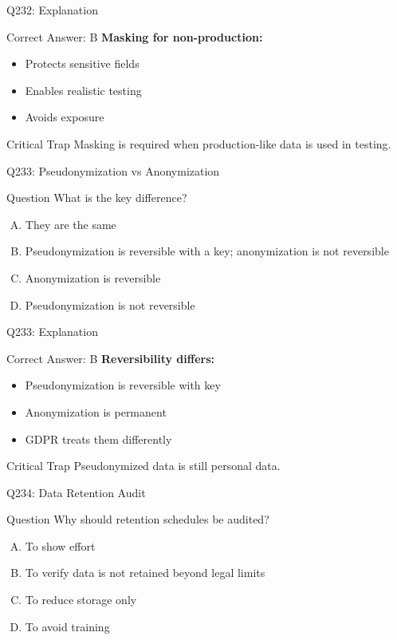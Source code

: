 \documentclass{beamer}
\begin{document}
	\begin{frame}{Q232: Explanation}
		\begin{block}{Correct Answer: B}
			\textbf{Masking for non-production:}
			\begin{itemize}
				\item Protects sensitive fields
				\item Enables realistic testing
				\item Avoids exposure
			\end{itemize}
		\end{block}
		\begin{alertblock}{Critical Trap}
			Masking is required when production-like data is used in testing.
		\end{alertblock}
	\end{frame}
	
	\begin{frame}{Q233: Pseudonymization vs Anonymization}
		\begin{block}{Question}
			What is the key difference?
		\end{block}
		\begin{enumerate}[(A)]
			\item They are the same
			\item Pseudonymization is reversible with a key; anonymization is not reversible
			\item Anonymization is reversible
			\item Pseudonymization is not reversible
		\end{enumerate}
	\end{frame}
	
	\begin{frame}{Q233: Explanation}
		\begin{block}{Correct Answer: B}
			\textbf{Reversibility differs:}
			\begin{itemize}
				\item Pseudonymization is reversible with key
				\item Anonymization is permanent
				\item GDPR treats them differently
			\end{itemize}
		\end{block}
		\begin{alertblock}{Critical Trap}
			Pseudonymized data is still personal data.
		\end{alertblock}
	\end{frame}
	
	\begin{frame}{Q234: Data Retention Audit}
		\begin{block}{Question}
			Why should retention schedules be audited?
		\end{block}
		\begin{enumerate}[(A)]
			\item To show effort
			\item To verify data is not retained beyond legal limits
			\item To reduce storage only
			\item To avoid training
		\end{enumerate}
	\end{frame}
	
\end{document}
